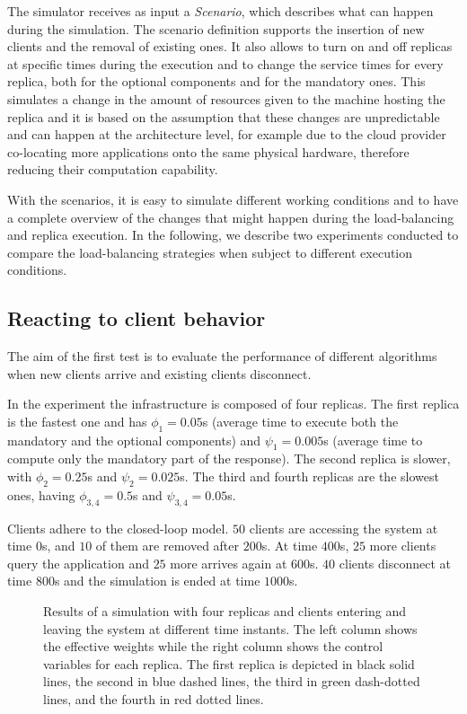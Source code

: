 The simulator receives as input a \emph{Scenario}, which describes
what can happen during the simulation. The scenario definition
supports the insertion of new clients and the removal of existing
ones. It also allows to turn on and off replicas at specific times
during the execution and to change the service times for every
replica, both for the optional components and for the mandatory
ones. This simulates a change in the amount of resources given to the
machine hosting the replica and it is based on the assumption that
these changes are unpredictable and can happen at the architecture
level, for example due to the cloud provider co-locating more
applications onto the same physical hardware, therefore reducing their
computation capability.

With the scenarios, it is easy to simulate different working
conditions and to have a complete overview of the changes that might
happen during the load-balancing and replica execution. In the
following, we describe two experiments conducted to compare the
load-balancing strategies when subject to different execution
conditions.

\subsection{Reacting to client behavior}

The aim of the first test is to evaluate the performance of different
algorithms when new clients arrive and existing clients disconnect.

In the experiment the infrastructure is composed of four replicas. The
first replica is the fastest one and has $\phi_1 = 0.05$s (average
time to execute both the mandatory and the optional components) and
$\psi_1 = 0.005$s (average time to compute only the mandatory part of
the response). The second replica is slower, with $\phi_2 = 0.25$s and
$\psi_2 = 0.025$s. The third and fourth replicas are the slowest ones,
having $\phi_{3,4} = 0.5$s and $\psi_{3,4} = 0.05$s.

Clients adhere to the closed-loop model. $50$ clients are accessing
the system at time $0$s, and $10$ of them are removed after $200$s. At
time $400$s, $25$ more clients query the application and $25$ more
arrives again at $600$s. $40$ clients disconnect at time $800$s and
the simulation is ended at time $1000$s.

\begin{figure}[t!]
  \centering 
  \caption{Results of a simulation with four replicas and clients
    entering and leaving the system at different time instants. The
    left column shows the effective weights while the right column
    shows the control variables for each replica. The first replica is
    depicted in black solid lines, the second in blue dashed lines,
    the third in green dash-dotted lines, and the fourth in red dotted
    lines.}
    \vspace{-8mm}
\label{fig:clientchanges-full}
\end{figure}

